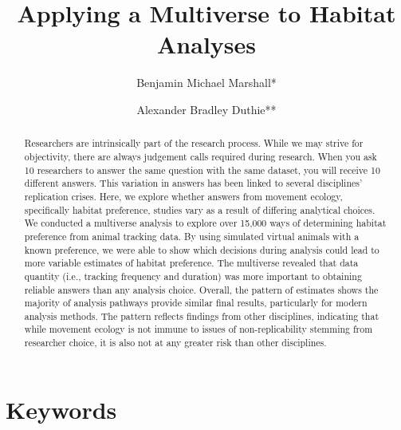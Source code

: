 \documentclass[10pt,a4paper]{article}
\begin{document}
\pagestyle{fancy}

\title{Applying a Multiverse to Habitat Analyses}
\author[1]{Benjamin Michael Marshall*}
\author[1]{Alexander Bradley Duthie**}


\maketitle
\thispagestyle{fancy}

\begin{abstract}

Researchers are intrinsically part of the research process. While we may strive for objectivity, there are always judgement calls required during research. When you ask 10 researchers to answer the same question with the same dataset, you will receive 10 different answers. This variation in answers has been linked to several disciplines' replication crises. Here, we explore whether answers from movement ecology, specifically habitat preference, studies vary as a result of differing analytical choices. We conducted a multiverse analysis to explore over 15,000 ways of determining habitat preference from animal tracking data. By using simulated virtual animals with a known preference, we were able to show which decisions during analysis could lead to more variable estimates of habitat preference. The multiverse revealed that data quantity (i.e., tracking frequency and duration) was more important to obtaining reliable answers than any analysis choice. Overall, the pattern of estimates shows the majority of analysis pathways provide similar final results, particularly for modern analysis methods. The pattern reflects findings from other disciplines, indicating that while movement ecology is not immune to issues of non-replicability stemming from researcher choice, it is also not at any greater risk than other disciplines.

\end{abstract}

\section*{Keywords}
\end{document}
